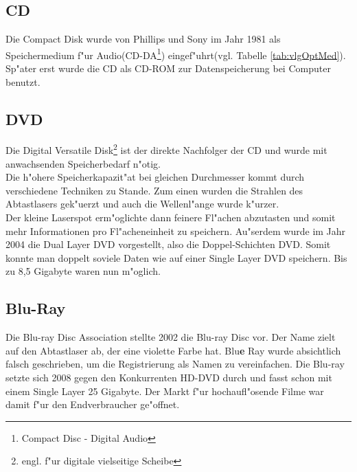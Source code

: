         \subsection{CD}
        \label{ch:Technisch:sec:Optische Speicherung:sub:CD}
        
            Die Compact Disk wurde von Phillips und Sony im Jahr 1981 als Speichermedium f"ur Audio(CD-DA\footnote{Compact Disc - Digital Audio}) eingef"uhrt(vgl. Tabelle \ref{tab:vlgOptMed}). Sp"ater erst wurde die CD als CD-ROM zur Datenspeicherung bei Computer benutzt. 
        
        \subsection{DVD}
        \label{ch:Technisch:sec:Optische Speicherung:sub:DVD}
        
            Die Digital Versatile Disk\footnote{engl. f"ur digitale vielseitige Scheibe} ist der direkte Nachfolger der CD und wurde mit anwachsenden Speicherbedarf n"otig. 
            \\
            Die h"ohere Speicherkapazit"at bei gleichen Durchmesser kommt durch verschiedene Techniken zu Stande. Zum einen wurden die Strahlen des Abtastlasers gek"uerzt und auch die Wellenl"ange wurde k"urzer. 
			\\
			Der kleine Laserspot erm"oglichte dann feinere Fl"achen abzutasten und somit mehr Informationen pro Fl"acheneinheit zu speichern. Au"serdem wurde im Jahr 2004 die Dual Layer DVD vorgestellt, also die \glqq Doppel-Schichten DVD\grqq{}. Somit konnte man doppelt soviele Daten wie auf einer Single Layer DVD speichern. Bis zu 8,5 Gigabyte waren nun m"oglich.
        
        \subsection{Blu-Ray}
        \label{ch:Technisch:sec:Optische Speicherung:sub:Blu-Ray}
        
            Die Blu-ray Disc Association stellte 2002 die Blu-ray Disc vor. Der Name zielt auf den Abtastlaser ab, der eine violette Farbe hat. Blu\textbf{e} Ray wurde absichtlich falsch geschrieben, um die Registrierung als Namen zu vereinfachen. Die Blu-ray setzte sich 2008 gegen den Konkurrenten HD-DVD durch und fasst schon mit einem Single Layer 25 Gigabyte.\cite{Wojciechowski:bluray} Der Markt f"ur hochaufl"osende Filme war damit f"ur den Endverbraucher ge"offnet.
            \\
           



